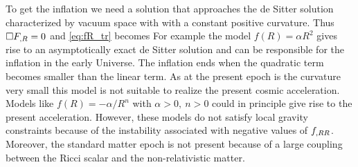 To get the inflation we need a solution that approaches the de Sitter solution characterized by vacuum space with with a constant positive curvature. Thus $\Box F_{,R}=0$ and \eqref{eq:fR_tr} becomes
For example the model $f(R)=\alpha R^2$ gives rise to an asymptotically exact de Sitter solution and can be responsible for the inflation in the early Universe. The inflation ends when the quadratic term becomes smaller than the linear term. As at the present epoch is the curvature very small this model is not suitable to realize the present cosmic acceleration. Models like $f(R)=-\alpha/R^n$ with $\alpha>0,\ n>0$ could in principle give rise to the present acceleration. However, these models do not satisfy local gravity constraints because of the instability associated with negative values of $f_{,RR}$. Moreover, the standard matter epoch is not present because of a large coupling between the Ricci scalar and the non-relativistic matter.


